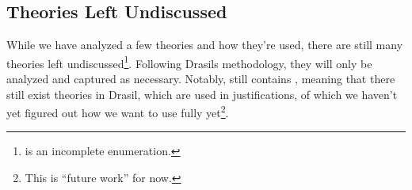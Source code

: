 \subsection{Theories Left Undiscussed}
\label{chap:more-theory-kinds:sec:classify-all-the-theories:subsec:theories-left-undiscussed}

While we have analyzed a few theories and how they're used, there are still many
theories left undiscussed\footnote{\ModelKinds{} is an incomplete enumeration.}.
Following Drasils methodology, they will only be analyzed and captured as
necessary. Notably, \ModelKinds{} still contains \OthModel{}, meaning that there
still exist theories in Drasil, which are used in justifications, of which we
haven't yet figured out how we want to use fully yet\footnote{This is ``future
work'' for now.}.

